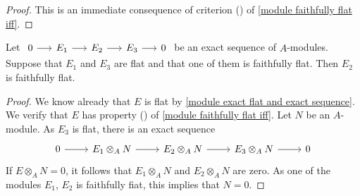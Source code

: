 \begin{proof}
This is an immediate consequence of criterion () of \cref{module faithfully flat iff}.
\end{proof}
\begin{proposition}\label{module faithfully flat and exact sequence}
Let $\begin{tikzcd}[column sep=15pt]0\ar[r]&E_1\ar[r]&E_2\ar[r]&E_3\ar[r]&0\end{tikzcd}$ be an exact sequence of $A$-modules. Suppose that $E_1$ and $E_3$ are flat and that one of them is faithfully flat. Then $E_2$ is faithfully flat.
\end{proposition}
\begin{proof}
We know already that $E$ is flat by \cref{module exact flat and exact sequence}. We verify that $E$ has property () of \cref{module faithfully flat iff}. Let $N$ be an $A$-module. As $E_3$ is flat, there is an exact sequence
\[\begin{tikzcd}
0\ar[r]&E_1\otimes_AN\ar[r]&E_2\otimes_AN\ar[r]&E_3\otimes_AN\ar[r]&0
\end{tikzcd}\]
If $E\otimes_AN=0$, it follows that $E_1\otimes_AN$ and $E_2\otimes_AN$ are zero. As one of the modules $E_1$, $E_2$ is faithfully fiat, this implies that $N=0$.
\end{proof}
